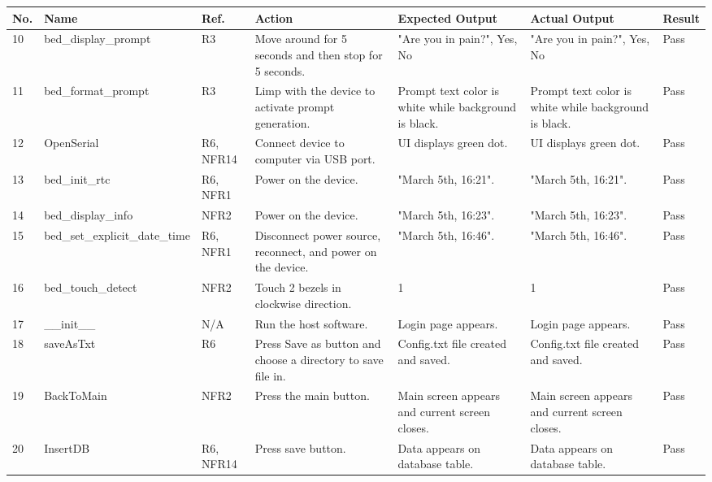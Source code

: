 \documentclass[12pt, titlepage]{article}
\begin{document}
\begin{center}
\begin{table} 
\begin{tabular}{ | p{0.5cm} | p{2.8cm} |  p{1.1cm} | p{2.7cm} | p{2.7cm} | p{2.7cm} | p{1.1cm} |}
\hline
\textbf{No.} & \textbf{Name}  & \textbf{Ref.} & \textbf{Action} & \textbf{Expected Output} & \textbf{Actual Output} & \textbf{Result} \\
\hline
10 & bed\_display\newline \_prompt & R3 & Move around for 5 seconds and then stop for 5 seconds. & "Are you in pain?", Yes, No & "Are you in pain?", Yes, No & Pass \\ 
\hline
11 & bed\_format\newline \_prompt & R3 & Limp with the device to activate prompt generation. & Prompt text color is white while background is black. & Prompt text color is white while background is black.  & Pass \\ 
\hline
12 & OpenSerial & R6, NFR14 & Connect device to computer via USB port. & UI displays green dot. & UI displays green dot. & Pass \\ 
\hline
13 & bed\_init\_rtc & R6, NFR1 & Power on the device. & "March 5th, 16:21". & "March 5th, 16:21". & Pass \\ 
\hline
14 & bed\_display\_info & NFR2 & Power on the device. & "March 5th, 16:23". & "March 5th, 16:23". & Pass \\ 
\hline
15 & bed\_set\newline \_explicit\_date\newline \_time & R6, NFR1 & Disconnect power source, reconnect, and power on the device. & "March 5th, 16:46". & "March 5th, 16:46". & Pass \\ 
\hline
16 & bed\_touch\newline \_detect & NFR2 & Touch 2 bezels in clockwise direction. & 1 & 1 & Pass \\ 
\hline
17 & \_\_init\_\_ & N/A & Run the host software. & Login page appears. & Login page appears. & Pass \\ 
\hline
18 & saveAsTxt & R6 & Press Save as button and choose a directory to save file in. & Config.txt file created and saved. & Config.txt file created and saved. & Pass \\ 
\hline
19 & BackToMain & NFR2 & Press the main button. & Main screen appears and current screen closes. & Main screen appears and current screen closes. & Pass \\ 
\hline
20 &  InsertDB & R6, NFR14 & Press save button. & Data appears on database table. & Data appears on database table. & Pass \\ 
\hline
\end{tabular}
\end{table}
\end{center}
\end{document}
